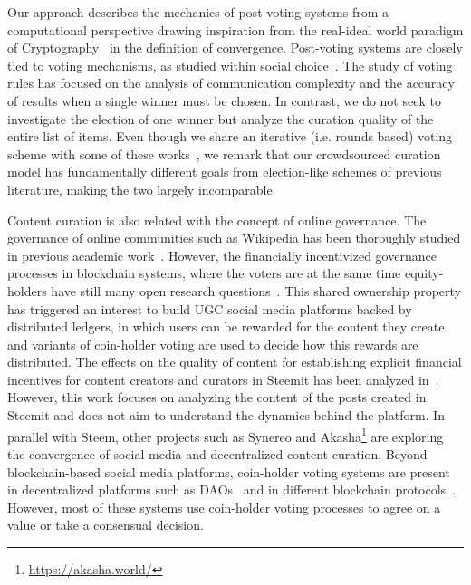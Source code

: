 Our approach  describes the mechanics of post-voting systems from a computational perspective  drawing inspiration from the real-ideal world paradigm of Cryptography~\cite{goldreich1999foundations,lindell}  in the definition of convergence. 
Post-voting systems are closely tied to voting mechanisms, as studied within  social choice~\cite{lu2011robust,conitzer2005communication,xia2010compilation}. The study of voting rules has focused on the analysis of communication complexity and the accuracy of results when a single winner must be chosen. In contrast, we do not seek to investigate the election of one winner but analyze the curation quality of the entire list of items. Even though we share an iterative (i.e. rounds based) voting scheme with some of these works~\cite{kalech2011practical}, we remark that our crowdsourced curation model has fundamentally different goals from election-like schemes of previous literature, making the two largely incomparable.  

  Content curation is also related with the concept of online governance. The governance of online communities such as Wikipedia has been thoroughly studied in previous academic work~\cite{leskovec2010governance,forte2008scaling}. However, the financially incentivized governance processes in blockchain systems, where the voters are at the same time equity-holders have still many open research questions~\cite{vitalik,ehrsam}. This shared ownership property has triggered an interest to build UGC social media platforms backed by distributed ledgers, in which users can be rewarded for the content they create and variants of coin-holder voting are used to decide how this rewards are distributed.  
  The effects on the quality of content for establishing explicit financial incentives for content creators and curators in Steemit has been analyzed in~\cite{thelwall2017can}. However, this work focuses on analyzing the content of the posts created in Steemit and does not aim to understand the dynamics behind the platform. In parallel with Steem, other projects such as Synereo\cite{synereo} and Akasha\footnote{\url{https://akasha.world/}} are exploring the convergence of social media and decentralized content curation.
   Beyond blockchain-based social media platforms, coin-holder voting systems are present in decentralized platforms such as DAOs~\cite{darkdaos} and in different blockchain protocols~\cite{dash,tezos}. However, most of these systems use coin-holder voting processes to agree on a value or take a consensual decision.
    
    
